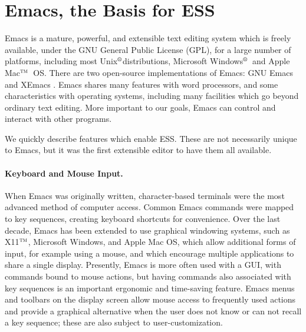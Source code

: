 \documentclass{article}
\newcommand*{\regstrd}{$^{\mbox{\scriptsize{\textregistered}}}$}
\newcommand*{\tm}{$^{\mbox{\scriptsize\sc tm}}$}
\begin{document}
\section{Emacs, the Basis for ESS}
\label{sec:emacs}

Emacs is a mature, powerful, and extensible text editing system which
is freely available, under the GNU General Public License (GPL), for a
large number of platforms, including most Unix\regstrd distributions,
Microsoft Windows\regstrd\ and Apple Mac\tm\ OS.  There are two
open-source implementations of Emacs: GNU Emacs \citep{GNU-Emacs} and
XEmacs \citep{XEmacs}.  Emacs shares many features with word
processors, and some characteristics with operating systems, including
many facilities which go beyond ordinary text editing.  More important
to our goals, Emacs can control and interact with other programs.

We quickly describe features which enable ESS.  These are not
necessarily unique to Emacs, but it was the first extensible editor to
have them all available.

\paragraph{Keyboard and Mouse Input.}
When Emacs was originally written, character-based terminals were the
most advanced method of computer access.  Common Emacs commands were
mapped to key sequences, creating keyboard shortcuts for convenience.
Over the last decade, Emacs has been extended to use graphical
windowing systems, such as X11\tm, Microsoft Windows, and Apple Mac
OS, which allow additional forms of input, for example using a mouse,
and which encourage multiple applications to share a single display.
Presently, Emacs is more often used with a GUI, with commands bound to
mouse actions, but having commands also associated with key sequences
is an important ergonomic and time-saving feature.  Emacs menus and
toolbars on the display screen allow mouse access to frequently used
actions and provide a graphical alternative when the user does not
know or can not recall a key sequence; these are also subject to
user-customization.
\end{document}
